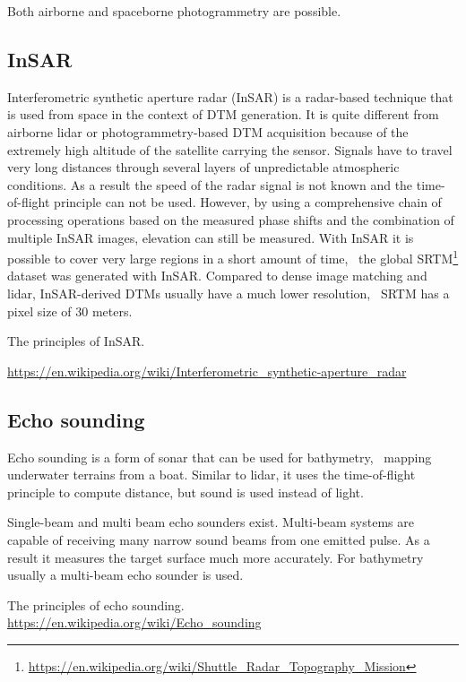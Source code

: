 Both airborne and spaceborne photogrammetry are possible.

\subsection{InSAR}
Interferometric synthetic aperture radar (InSAR) is a radar-based technique that is used from space in the context of DTM generation. 
It is quite different from airborne lidar or photo\-gramme\-try-based DTM acquisition because of the extremely high altitude of the satellite carrying the sensor. 
Signals have to travel very long distances through several layers of unpredictable atmospheric conditions. 
As a result the speed of the radar signal is not known and the time-of-flight principle can not be used. 
However, by using a comprehensive chain of processing operations based on the measured phase shifts and the combination of multiple InSAR images, elevation can still be measured. 
With InSAR it is possible to cover very large regions in a short amount of time, \eg\ the global SRTM\footnote{\url{https://en.wikipedia.org/wiki/Shuttle_Radar_Topography_Mission}} dataset was generated with InSAR\@. 
Compared to dense image matching and lidar, InSAR-derived DTMs usually have a much lower resolution, \eg\ SRTM has a pixel size of 30 meters.

\begin{link-box}
The principles of InSAR\@.

\url{https://en.wikipedia.org/wiki/Interferometric_synthetic-aperture_radar}
\end{link-box}

\subsection{Echo sounding}
\label{sec:mbes}
Echo sounding is a form of sonar that can be used for bathymetry, \ie\ mapping underwater terrains from a boat. 
Similar to lidar, it uses the time-of-flight principle to compute distance, but sound is used instead of light. 

Single-beam and multi beam echo sounders exist. Multi-beam systems are capable of receiving many narrow sound beams from one emitted pulse. As a result it measures the target surface much more accurately. 
For bathymetry usually a multi-beam echo sounder is used.

\begin{link-box}
  The principles of echo sounding.
  \\
  \url{https://en.wikipedia.org/wiki/Echo_sounding}
\end{link-box}





